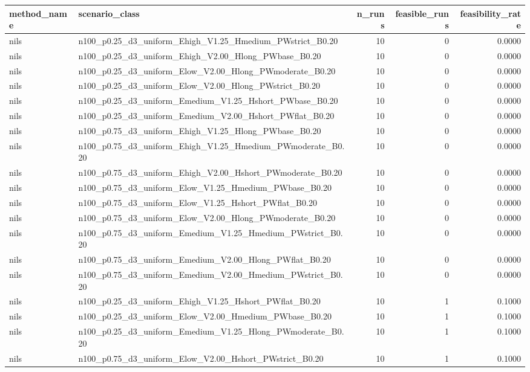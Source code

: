 \begin{tabular}{llrrr}
\toprule
method_name & scenario_class & n_runs & feasible_runs & feasibility_rate \\
\midrule
nils & n100_p0.25_d3_uniform_Ehigh_V1.25_Hmedium_PWstrict_B0.20 & 10 & 0 & 0.0000 \\
nils & n100_p0.25_d3_uniform_Ehigh_V2.00_Hlong_PWbase_B0.20 & 10 & 0 & 0.0000 \\
nils & n100_p0.25_d3_uniform_Elow_V2.00_Hlong_PWmoderate_B0.20 & 10 & 0 & 0.0000 \\
nils & n100_p0.25_d3_uniform_Elow_V2.00_Hlong_PWstrict_B0.20 & 10 & 0 & 0.0000 \\
nils & n100_p0.25_d3_uniform_Emedium_V1.25_Hshort_PWbase_B0.20 & 10 & 0 & 0.0000 \\
nils & n100_p0.25_d3_uniform_Emedium_V2.00_Hshort_PWflat_B0.20 & 10 & 0 & 0.0000 \\
nils & n100_p0.75_d3_uniform_Ehigh_V1.25_Hlong_PWbase_B0.20 & 10 & 0 & 0.0000 \\
nils & n100_p0.75_d3_uniform_Ehigh_V1.25_Hmedium_PWmoderate_B0.20 & 10 & 0 & 0.0000 \\
nils & n100_p0.75_d3_uniform_Ehigh_V2.00_Hshort_PWmoderate_B0.20 & 10 & 0 & 0.0000 \\
nils & n100_p0.75_d3_uniform_Elow_V1.25_Hmedium_PWbase_B0.20 & 10 & 0 & 0.0000 \\
nils & n100_p0.75_d3_uniform_Elow_V1.25_Hshort_PWflat_B0.20 & 10 & 0 & 0.0000 \\
nils & n100_p0.75_d3_uniform_Elow_V2.00_Hlong_PWmoderate_B0.20 & 10 & 0 & 0.0000 \\
nils & n100_p0.75_d3_uniform_Emedium_V1.25_Hmedium_PWstrict_B0.20 & 10 & 0 & 0.0000 \\
nils & n100_p0.75_d3_uniform_Emedium_V2.00_Hlong_PWflat_B0.20 & 10 & 0 & 0.0000 \\
nils & n100_p0.75_d3_uniform_Emedium_V2.00_Hmedium_PWstrict_B0.20 & 10 & 0 & 0.0000 \\
nils & n100_p0.25_d3_uniform_Ehigh_V1.25_Hshort_PWflat_B0.20 & 10 & 1 & 0.1000 \\
nils & n100_p0.25_d3_uniform_Elow_V2.00_Hmedium_PWbase_B0.20 & 10 & 1 & 0.1000 \\
nils & n100_p0.25_d3_uniform_Emedium_V1.25_Hlong_PWmoderate_B0.20 & 10 & 1 & 0.1000 \\
nils & n100_p0.75_d3_uniform_Elow_V2.00_Hshort_PWstrict_B0.20 & 10 & 1 & 0.1000 \\

\end{tabular}

